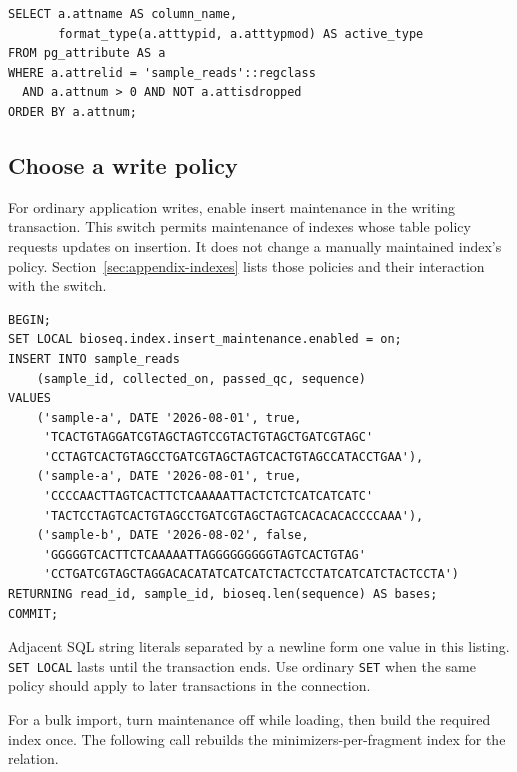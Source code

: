 \par\noindent\begin{minipage}{\linewidth}
\begin{lstlisting}[style=bioseq-appendix-sql]
SELECT a.attname AS column_name,
       format_type(a.atttypid, a.atttypmod) AS active_type
FROM pg_attribute AS a
WHERE a.attrelid = 'sample_reads'::regclass
  AND a.attnum > 0 AND NOT a.attisdropped
ORDER BY a.attnum;
\end{lstlisting}
\end{minipage}

\subsection{Choose a write policy}

For ordinary application writes, enable insert maintenance in the writing
transaction. This switch permits maintenance of indexes whose table policy
requests updates on insertion. It does not change a manually maintained
index's policy. Section~\ref{sec:appendix-indexes} lists those policies and
their interaction with the switch.

\par\noindent\begin{minipage}{\linewidth}
\begin{lstlisting}[style=bioseq-appendix-sql]
BEGIN;
SET LOCAL bioseq.index.insert_maintenance.enabled = on;
INSERT INTO sample_reads
    (sample_id, collected_on, passed_qc, sequence)
VALUES
    ('sample-a', DATE '2026-08-01', true,
     'TCACTGTAGGATCGTAGCTAGTCCGTACTGTAGCTGATCGTAGC'
     'CCTAGTCACTGTAGCCTGATCGTAGCTAGTCACTGTAGCCATACCTGAA'),
    ('sample-a', DATE '2026-08-01', true,
     'CCCCAACTTAGTCACTTCTCAAAAATTACTCTCTCATCATCATC'
     'TACTCCTAGTCACTGTAGCCTGATCGTAGCTAGTCACACACACCCCAAA'),
    ('sample-b', DATE '2026-08-02', false,
     'GGGGGTCACTTCTCAAAAATTAGGGGGGGGGTAGTCACTGTAG'
     'CCTGATCGTAGCTAGGACACATATCATCATCTACTCCTATCATCATCTACTCCTA')
RETURNING read_id, sample_id, bioseq.len(sequence) AS bases;
COMMIT;
\end{lstlisting}
\end{minipage}

Adjacent SQL string literals separated by a newline form one value in this
listing. \texttt{SET LOCAL} lasts until the transaction ends. Use ordinary
\texttt{SET} when the same policy should apply to later transactions in the
connection.

For a bulk import, turn maintenance off while loading, then build the required
index once. The following call rebuilds the minimizers-per-fragment index for
the relation.

